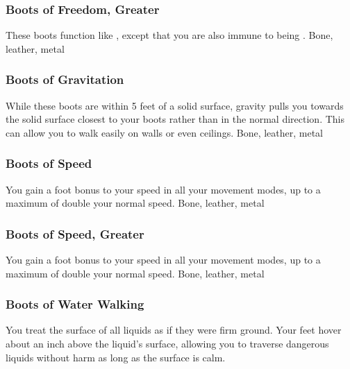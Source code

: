 \hypertarget{item:Boots of Freedom, Greater}{\subsubsection{Boots of Freedom, Greater\hfill{}}}
These boots function like , except that you are also immune to being \grappled.
 
 Bone, leather, metal
\lowercase{\hypertarget{item:Boots of Gravitation}{}}\label{item:Boots of Gravitation}
\hypertarget{item:Boots of Gravitation}{\subsubsection{Boots of Gravitation\hfill{}}}
While these boots are within 5 feet of a solid surface, gravity pulls you towards the solid surface closest to your boots rather than in the normal direction.
This can allow you to walk easily on walls or even ceilings.
 
 Bone, leather, metal
\lowercase{\hypertarget{item:Boots of Speed}{}}\label{item:Boots of Speed}
\hypertarget{item:Boots of Speed}{\subsubsection{Boots of Speed\hfill{}}}
You gain a  foot bonus to your speed in all your movement modes, up to a maximum of double your normal speed.
 
 Bone, leather, metal
\lowercase{\hypertarget{item:Boots of Speed, Greater}{}}\label{item:Boots of Speed, Greater}
\hypertarget{item:Boots of Speed, Greater}{\subsubsection{Boots of Speed, Greater\hfill{}}}
You gain a  foot bonus to your speed in all your movement modes, up to a maximum of double your normal speed.
 
 Bone, leather, metal
\lowercase{\hypertarget{item:Boots of Water Walking}{}}\label{item:Boots of Water Walking}
\hypertarget{item:Boots of Water Walking}{\subsubsection{Boots of Water Walking\hfill{}}}
You treat the surface of all liquids as if they were firm ground.
Your feet hover about an inch above the liquid's surface, allowing you to traverse dangerous liquids without harm as long as the surface is calm.
